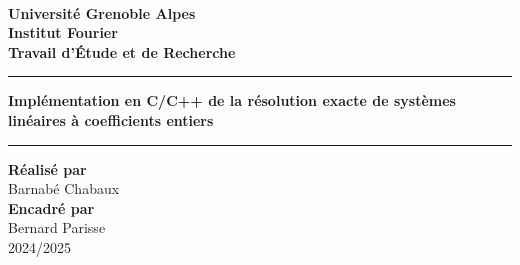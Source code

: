 \documentclass[french]{article}
\begin{document}
\begin{titlepage}
	\begin{figure}[htbp]
		\hbox{
			\hspace*{12.5cm}
		}
	\end{figure}
	\vspace {-1.8cm}
	\begin{center}
		{\bf {\large Université Grenoble Alpes}}\\
		{\bf {\large Institut Fourier}}\\
		\vspace{4cm}
		\huge{\textbf{Travail d'Étude et de Recherche}}\\
		\vspace{0.7cm}
		\noindent\rule{\textwidth}{1mm}
		\Large{\textbf{Implémentation en C/C++ de la résolution exacte de systèmes linéaires à coefficients entiers}}
		\noindent\rule{\textwidth}{1mm}
		\vspace{0.7cm}
		
		{\large
		\textbf{Réalisé par}\\
		Barnabé Chabaux\\
		\vspace{0.5cm}
		\textbf{Encadré par}\\
		Bernard Parisse\\}
		\vspace{9cm}
		2024/2025
	\end{center}
\end{titlepage}
\tableofcontents
\newpage
\end{document}
